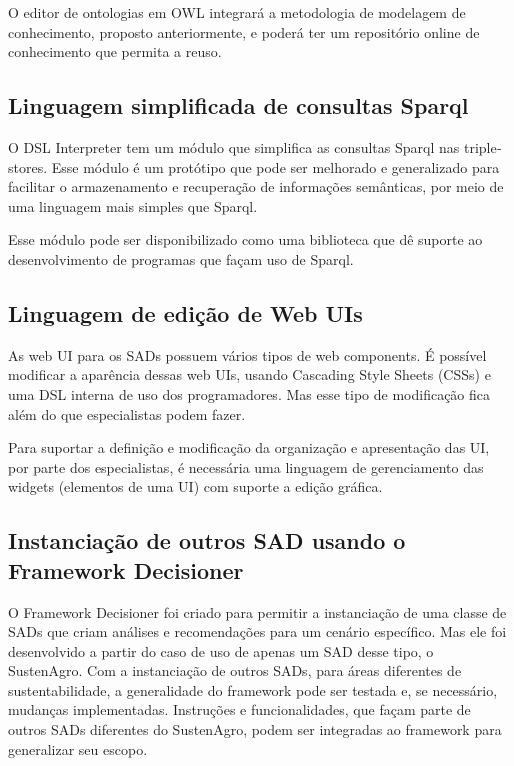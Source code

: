O editor de ontologias em OWL integrará a metodologia de modelagem
de conhecimento, proposto anteriormente, e poderá ter um repositório
online de conhecimento que permita a reuso.

\subsection*{Linguagem simplificada de consultas Sparql}

O \foreignlanguage{english}{DSL Interpreter} tem um módulo que simplifica
as consultas Sparql nas \foreignlanguage{english}{triplestores}. Esse
módulo é um protótipo que pode ser melhorado e generalizado para facilitar
o armazenamento e recuperação de informações semânticas, por meio
de uma linguagem mais simples que Sparql. 

Esse módulo pode ser disponibilizado como uma biblioteca que dê suporte
ao desenvolvimento de programas que façam uso de Sparql. 

\subsection*{Linguagem de edição de \foreignlanguage{english}{Web UIs}}

As \foreignlanguage{english}{web UI} para os SADs possuem vários tipos
de \foreignlanguage{english}{web components}. É possível modificar
a aparência dessas web UIs, usando \foreignlanguage{english}{Cascading
Style Sheets (CSSs)} e uma DSL interna de uso dos programadores. Mas
esse tipo de modificação fica além do que especialistas podem fazer. 

Para suportar a definição e modificação da organização e apresentação
das UI, por parte dos especialistas, é necessária uma linguagem de
gerenciamento das \foreignlanguage{english}{widgets} (elementos de
uma \foreignlanguage{english}{UI}) com suporte a edição gráfica. 

\subsection*{Instanciação de outros SAD usando o Framework Decisioner}

O Framework Decisioner foi criado para permitir a instanciação de
uma classe de SADs que criam análises e recomendações para um cenário
específico. Mas ele foi desenvolvido a partir do caso de uso de apenas
um SAD desse tipo, o SustenAgro. Com a instanciação de outros SADs,
para áreas diferentes de sustentabilidade, a generalidade do framework
pode ser testada e, se necessário, mudanças implementadas. Instruções
e funcionalidades, que façam parte de outros SADs diferentes do SustenAgro,
podem ser integradas ao framework para generalizar seu escopo.

